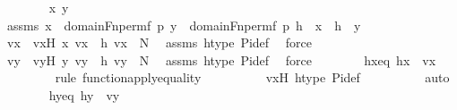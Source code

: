 \begin{isabellebody}
\ \ \ \ \ \ \isamarkupfalse%
\ x\ y\ \isanewline
\ \ \ \ \ \ \isamarkupfalse%
\ assms{}{\isacharcolon}{\kern0pt}\ {\isachardoublequoteopen}x\ {\isasymin}\ domain{\isacharparenleft}{\kern0pt}Fn{\isacharunderscore}{\kern0pt}perm{\isacharparenleft}{\kern0pt}f{\isacharcomma}{\kern0pt}\ p{\isacharparenright}{\kern0pt}{\isacharparenright}{\kern0pt}{\isachardoublequoteclose}\ {\isachardoublequoteopen}y\ {\isasymin}\ domain{\isacharparenleft}{\kern0pt}Fn{\isacharunderscore}{\kern0pt}perm{\isacharparenleft}{\kern0pt}f{\isacharcomma}{\kern0pt}\ p{\isacharparenright}{\kern0pt}{\isacharparenright}{\kern0pt}{\isachardoublequoteclose}\ {\isachardoublequoteopen}h\ {\isacharbackquote}{\kern0pt}\ x\ {\isacharequal}{\kern0pt}\ h\ {\isacharbackquote}{\kern0pt}\ y{\isachardoublequoteclose}\isanewline
\ \ \ \ \ \ \isamarkupfalse%
\ vx\ \ vxH{\isacharcolon}{\kern0pt}\ {\isachardoublequoteopen}{\isacharless}{\kern0pt}x{\isacharcomma}{\kern0pt}\ vx{\isachargreater}{\kern0pt}\ {\isasymin}\ h{\isachardoublequoteclose}\ {\isachardoublequoteopen}vx\ {\isasymin}\ N{\isachardoublequoteclose}\ \isamarkupfalse%
\ assms{}\ htype\ Pi{\isacharunderscore}{\kern0pt}def\ \isamarkupfalse%
\ force\isanewline
\ \ \ \ \ \ \isamarkupfalse%
\ vy\ \ vyH{\isacharcolon}{\kern0pt}\ {\isachardoublequoteopen}{\isacharless}{\kern0pt}y{\isacharcomma}{\kern0pt}\ vy{\isachargreater}{\kern0pt}\ {\isasymin}\ h{\isachardoublequoteclose}\ {\isachardoublequoteopen}vy\ {\isasymin}\ N{\isachardoublequoteclose}\ \isamarkupfalse%
\ assms{}\ htype\ Pi{\isacharunderscore}{\kern0pt}def\ \isamarkupfalse%
\ force\isanewline
\isanewline
\ \ \ \ \ \ \isamarkupfalse%
\ hxeq{\isacharcolon}{\kern0pt}\ {\isachardoublequoteopen}h{\isacharbackquote}{\kern0pt}x\ {\isacharequal}{\kern0pt}\ vx{\isachardoublequoteclose}\ \isanewline
\ \ \ \ \ \ \ \ \isamarkupfalse%
{\isacharparenleft}{\kern0pt}rule\ function{\isacharunderscore}{\kern0pt}apply{\isacharunderscore}{\kern0pt}equality{\isacharparenright}{\kern0pt}\isanewline
\ \ \ \ \ \ \ \ \isamarkupfalse%
\ vxH\ htype\ Pi{\isacharunderscore}{\kern0pt}def\isanewline
\ \ \ \ \ \ \ \ \isamarkupfalse%
\ auto\isanewline
\ \ \ \ \ \ \isamarkupfalse%
\ hyeq{\isacharcolon}{\kern0pt}\ {\isachardoublequoteopen}h{\isacharbackquote}{\kern0pt}y\ {\isacharequal}{\kern0pt}\ vy{\isachardoublequoteclose}\ \isanewline

\end{isabellebody}
